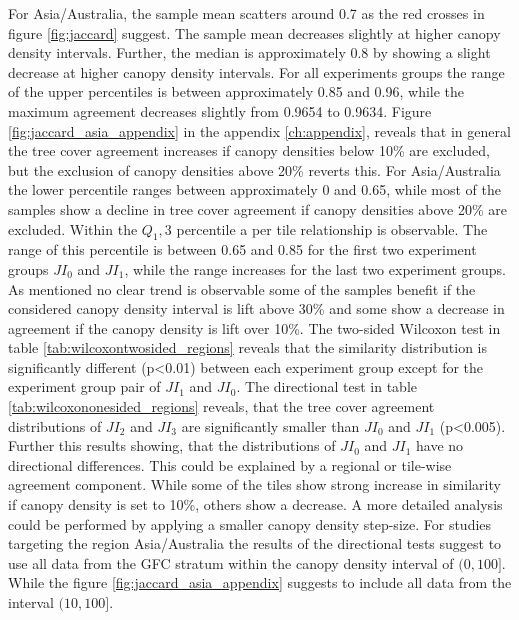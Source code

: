 			For Asia/Australia, the sample mean scatters around 0.7 as the red crosses in figure \ref{fig:jaccard} suggest. The sample mean decreases slightly at higher canopy density intervals. Further, the median is approximately 0.8 by showing a slight decrease at higher canopy density intervals. For all experiments groups the range of the upper percentiles is between approximately 0.85 and 0.96, while the maximum agreement decreases slightly from 0.9654 to 0.9634. Figure \ref{fig:jaccard_asia_appendix} in the appendix \ref{ch:appendix}, reveals that in general the tree cover agreement increases if canopy densities below 10\% are excluded, but the exclusion of canopy densities above 20\% reverts this. For Asia/Australia the lower percentile ranges between approximately 0 and 0.65, while most of the samples show a decline in tree cover agreement if canopy densities above 20\% are excluded. Within the $Q_1,3$ percentile a per tile relationship is observable. The range of this percentile is between 0.65 and 0.85 for the first two experiment groups $JI_0$ and $JI_1$, while the range increases for the last two experiment groups. As mentioned no clear trend is observable some of the samples benefit if the considered canopy density interval is lift above 30\% and some show a decrease in agreement if the canopy density is lift over 10\%. The two-sided Wilcoxon test in table \ref{tab:wilcoxontwosided_regions} reveals that the similarity distribution is significantly different (p<0.01) between each experiment group except for the experiment group pair of $JI_1$ and $JI_0$. The directional test in table \ref{tab:wilcoxononesided_regions} reveals, that the tree cover agreement distributions of $JI_2$ and $JI_3$ are significantly smaller than $JI_0$ and $JI_1$ (p<0.005). Further this results showing, that the distributions of $JI_0$ and $JI_1$ have no directional differences. This could be explained by a regional or tile-wise agreement component. While some of the tiles show strong increase in similarity if canopy density is set to 10\%, others show a decrease. A more detailed analysis could be performed by applying a smaller canopy density step-size. For studies targeting the region Asia/Australia the results of the directional tests suggest to use all data from the \ac{GFC} stratum within the canopy density interval of $(0,100]$. While the figure \ref{fig:jaccard_asia_appendix} suggests to include all data from the interval $(10,100]$.

